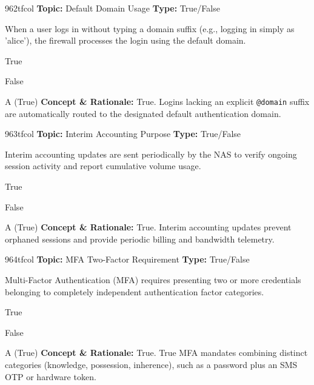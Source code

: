 \begin{qcard}{962}{tfcol}
\textcolor{darkslate!75}{\small\textbf{Topic:} Default Domain Usage \hfill \textbf{Type:} True/False}\vspace{0.4em}\par
When a user logs in without typing a domain suffix (e.g., logging in simply as 'alice'), the firewall processes the login using the default domain.
\begin{qoptions}
\item True
\item False
\end{qoptions}
\end{qcard}
\nopagebreak
\begin{explainbox}{A (True)}
\textbf{Concept \& Rationale:} True. Logins lacking an explicit \texttt{@domain} suffix are automatically routed to the designated default authentication domain.
\end{explainbox}

\begin{qcard}{963}{tfcol}
\textcolor{darkslate!75}{\small\textbf{Topic:} Interim Accounting Purpose \hfill \textbf{Type:} True/False}\vspace{0.4em}\par
Interim accounting updates are sent periodically by the NAS to verify ongoing session activity and report cumulative volume usage.
\begin{qoptions}
\item True
\item False
\end{qoptions}
\end{qcard}
\nopagebreak
\begin{explainbox}{A (True)}
\textbf{Concept \& Rationale:} True. Interim accounting updates prevent orphaned sessions and provide periodic billing and bandwidth telemetry.
\end{explainbox}

\begin{qcard}{964}{tfcol}
\textcolor{darkslate!75}{\small\textbf{Topic:} MFA Two-Factor Requirement \hfill \textbf{Type:} True/False}\vspace{0.4em}\par
Multi-Factor Authentication (MFA) requires presenting two or more credentials belonging to completely independent authentication factor categories.
\begin{qoptions}
\item True
\item False
\end{qoptions}
\end{qcard}
\nopagebreak
\begin{explainbox}{A (True)}
\textbf{Concept \& Rationale:} True. True MFA mandates combining distinct categories (knowledge, possession, inherence), such as a password plus an SMS OTP or hardware token.
\end{explainbox}


